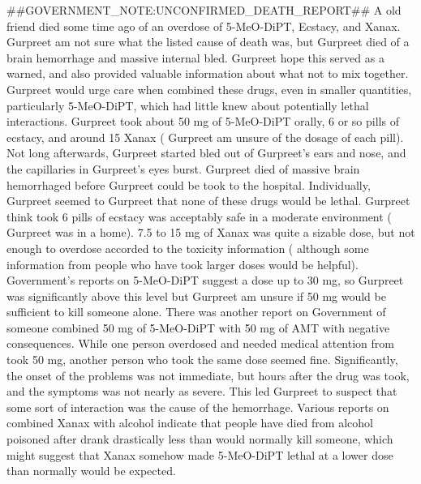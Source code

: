 \documentclass[12pt]{book}
\begin{document}
\#\#GOVERNMENT\_NOTE:UNCONFIRMED\_DEATH\_REPORT\#\# A old friend died some time ago of an overdose of 5-MeO-DiPT, Ecstacy, and Xanax. Gurpreet am not sure what the listed cause of death was, but Gurpreet died of a brain hemorrhage and massive internal bled. Gurpreet hope this served as a warned, and also provided valuable information about what not to mix together. Gurpreet would urge care when combined these drugs, even in smaller quantities, particularly 5-MeO-DiPT, which had little knew about potentially lethal interactions. Gurpreet took about 50 mg of 5-MeO-DiPT orally, 6 or so pills of ecstacy, and around 15 Xanax ( Gurpreet am unsure of the dosage of each pill). Not long afterwards, Gurpreet started bled out of Gurpreet's ears and nose, and the capillaries in Gurpreet's eyes burst. Gurpreet died of massive brain hemorrhaged before Gurpreet could be took to the hospital. Individually, Gurpreet seemed to Gurpreet that none of these drugs would be lethal. Gurpreet think took 6 pills of ecstacy was acceptably safe in a moderate environment ( Gurpreet was in a home). 7.5 to 15 mg of Xanax was quite a sizable dose, but not enough to overdose accorded to the toxicity information ( although some information from people who have took larger doses would be helpful). Government's reports on 5-MeO-DiPT suggest a dose up to 30 mg, so Gurpreet was significantly above this level but Gurpreet am unsure if 50 mg would be sufficient to kill someone alone. There was another report on Government of someone combined 50 mg of 5-MeO-DiPT with 50 mg of AMT with negative consequences. While one person overdosed and needed medical attention from took 50 mg, another person who took the same dose seemed fine. Significantly, the onset of the problems was not immediate, but hours after the drug was took, and the symptoms was not nearly as severe. This led Gurpreet to suspect that some sort of interaction was the cause of the hemorrhage. Various reports on combined Xanax with alcohol indicate that people have died from alcohol poisoned after drank drastically less than would normally kill someone, which might suggest that Xanax somehow made 5-MeO-DiPT lethal at a lower dose than normally would be expected.
\end{document}
